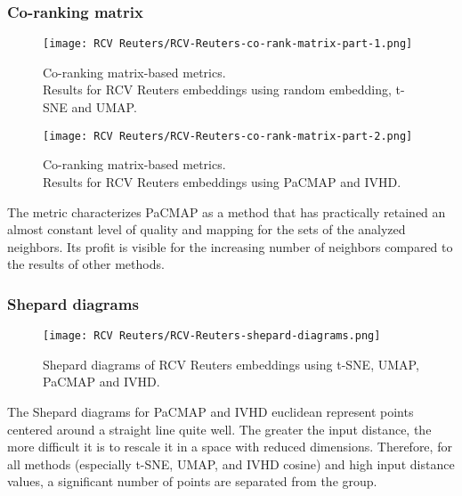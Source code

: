 \documentclass[12pt]{article}
\begin{document}
\clearpage
\subsubsection{Co-ranking matrix}
\begin{figure}[h]
    \centering
    \texttt{[image: RCV Reuters/RCV-Reuters-co-rank-matrix-part-1.png]}
    \caption{Co-ranking matrix-based metrics. \\ Results for RCV Reuters embeddings using random embedding, t-SNE and UMAP.}
\end{figure}

\clearpage
\begin{figure}[h]
    \centering
    \texttt{[image: RCV Reuters/RCV-Reuters-co-rank-matrix-part-2.png]}
    \caption{Co-ranking matrix-based metrics. \\ Results for RCV Reuters embeddings using PaCMAP and IVHD.}
\end{figure}
The metric characterizes PaCMAP as a method that has practically retained an almost constant level of quality and mapping for the sets of the analyzed neighbors. Its profit is visible for the increasing number of neighbors compared to the results of other methods.

\clearpage
\subsubsection{Shepard diagrams}
\begin{figure}[h]
    \centering
    \texttt{[image: RCV Reuters/RCV-Reuters-shepard-diagrams.png]}
    \caption{Shepard diagrams of RCV Reuters embeddings using t-SNE, UMAP, PaCMAP and IVHD.}
\end{figure}
The Shepard diagrams for PaCMAP and IVHD euclidean represent points centered around a straight line quite well. The greater the input distance, the more difficult it is to rescale it in a space with reduced dimensions. Therefore, for all methods (especially t-SNE, UMAP, and IVHD cosine) and high input distance values, a significant number of points are separated from the group.

\clearpage
\end{document}
